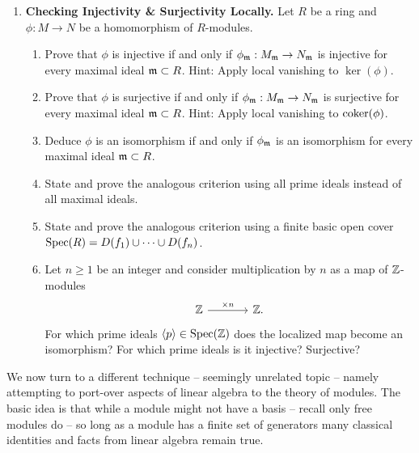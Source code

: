 \documentclass[12pt,reqno]{amsart}
\begin{document}
\begin{enumerate}[leftmargin=*, series=problems]
\item \textbf{Checking Injectivity \& Surjectivity Locally.} Let $R$ be a ring and $\phi:M\to N$ be a homomorphism of $R$-modules. 
\begin{enumerate}
    \item Prove that $\phi$ is injective if and only if $\phi_{\mathfrak{m}}:M_{\mathfrak{m}}\to N_{\mathfrak{m}}$ is injective for every maximal ideal $\mathfrak{m}\subset R$. Hint: Apply local vanishing to $\ker(\phi)$.
    \item Prove that $\phi$ is surjective if and only if $\phi_{\mathfrak{m}}:M_{\mathfrak{m}}\to N_{\mathfrak{m}}$ is surjective for every maximal ideal $\mathfrak{m}\subset R$. Hint: Apply local vanishing to $\operatorname{coker}(\phi)$.
    \item Deduce $\phi$ is an isomorphism if and only if $\phi_{\mathfrak{m}}$ is an isomorphism for every maximal ideal $\mathfrak{m}\subset R$.
    \item State and prove the analogous criterion using all prime ideals instead of all maximal ideals.
    \item State and prove the analogous criterion using a finite basic open cover $\operatorname{Spec}(R)=D(f_1)\cup\cdots\cup D(f_n)$.
    \item Let $n\geq 1$ be an integer and consider multiplication by $n$ as a map of $\mathbb{Z}$-modules
    \[
    \begin{tikzcd}[column sep=large]
    \ZZ \arrow[r, "\times n"] & \ZZ.
    \end{tikzcd}
    \]
    For which prime ideals $\langle p\rangle\in \operatorname{Spec}(\mathbb{Z})$ does the localized map become an isomorphism? For which prime ideals is it injective? Surjective?
\end{enumerate}
\end{enumerate}

\hrulefill

We now turn to a different technique -- seemingly unrelated topic -- namely attempting to port-over aspects of linear algebra to the theory of modules. The basic idea is that while a module might not have a basis -- recall only free modules do -- so long as a module has a finite set of generators many classical identities and facts from linear algebra remain true. 
\end{document}
